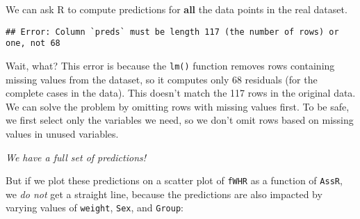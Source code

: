 \documentclass[]{book}
\newenvironment{Shaded}{\begin{snugshade}}{\end{snugshade}}
\newcommand{\DataTypeTok}[1]{\textcolor[rgb]{0.13,0.29,0.53}{#1}}
\newcommand{\KeywordTok}[1]{\textcolor[rgb]{0.13,0.29,0.53}{\textbf{#1}}}
\newcommand{\NormalTok}[1]{#1}
\newcommand{\OperatorTok}[1]{\textcolor[rgb]{0.81,0.36,0.00}{\textbf{#1}}}
\newcommand{\StringTok}[1]{\textcolor[rgb]{0.31,0.60,0.02}{#1}}
\begin{document}
We can ask R to compute predictions for \textbf{all} the data points in the real dataset.

\begin{Shaded}
\end{Shaded}

\begin{verbatim}
## Error: Column `preds` must be length 117 (the number of rows) or one, not 68
\end{verbatim}

Wait, what? This error is because the \texttt{lm()} function removes rows containing missing values from the dataset, so it computes only 68 residuals (for the complete cases in the data). This doesn't match the 117 rows in the original data. We can solve the problem by omitting rows with missing values first. To be safe, we first select only the variables we need, so we don't omit rows based on missing values in unused variables.

\begin{Shaded}
\end{Shaded}

\emph{We have a full set of predictions!}

But if we plot these predictions on a scatter plot of \texttt{fWHR} as a function of \texttt{AssR}, we \emph{do not} get a straight line, because the predictions are also impacted by varying values of \texttt{weight}, \texttt{Sex}, and \texttt{Group}:

\begin{Shaded}
\end{Shaded}
\end{document}

